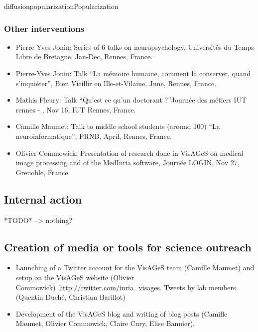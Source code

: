 \documentclass{ra2018}
\begin{document}
\begin{module}{diffusion}{popularization}{Popularization}
\subsubsection{Other interventions}
\begin{itemize}
    \item Pierre-Yves Jonin: Series of 6 talks on neuropsychology, Universités du Temps Libre de Bretagne, Jan-Dec, Rennes, France. 
    \item Pierre-Yves Jonin: Talk ``La mémoire humaine, comment la conserver, quand s’inquiéter'', Bien Vieillir en Ille-et-Vilaine, June, Rennes, France. 
    \item Mathis Fleury: Talk ``Qu'est ce qu'un doctorant ?''Journée des métiers IUT rennes - , Nov 16, IUT Rennes, France.
    \item Camille Maumet: Talk to middle school students  (around 100) ``La neuroinformatique'', PRNB, April, Rennes, France.
    \item Olivier Commowick: Presentation of research done in VisAGeS on medical image processing and of the MedInria software, Journée LOGIN, Nov 27, Grenoble, France. 
\end{itemize}

    
\subsection{Internal action}
*TODO* --> nothing?

\subsection{Creation of media or tools for science outreach}
\begin{itemize}
    \item Launching of a Twitter account for the VisAGeS team (Camille Maumet) and setup on the VisAGeS website (Olivier Commowick)~\url{http://twitter.com/inria_visages}. Tweets by lab members (Quentin Duché, Christian Barillot)
    \item Development of the VisAGeS blog and writing of blog posts (Camille Maumet, Olivier Commowick, Claire Cury, Elise Bannier).
\end{itemize}


\end{module}
\end{document}
